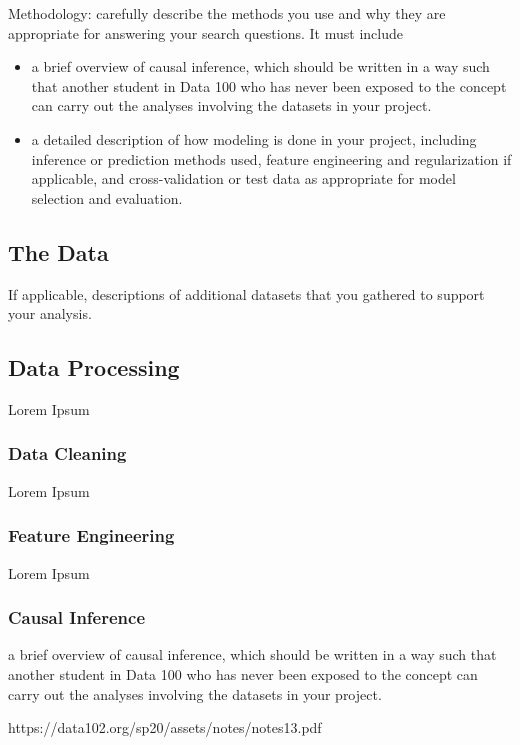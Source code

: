 \documentclass[11pt]{article}
\begin{document}
Methodology: carefully describe the methods you use and why they are appropriate for answering your search questions. It must include
\begin{itemize}
\item a brief overview of causal inference, which should be written in a way such that another student in Data 100 who has never been exposed to the concept can carry out the analyses involving the datasets in your project.
\item a detailed description of how modeling is done in your project, including inference or prediction methods used, feature engineering and regularization if applicable, and cross-validation or test data as appropriate for model selection and evaluation.
\end{itemize}


\subsection{The Data}

If applicable, descriptions of additional datasets that you gathered to support your analysis.

\subsection{Data Processing}
Lorem Ipsum \\

\subsubsection{Data Cleaning}
Lorem Ipsum \\

\subsubsection{Feature Engineering}
Lorem Ipsum \\


\subsubsection{Causal Inference}
a brief overview of causal inference, which should be written in a way such that another student in Data 100 who has never been exposed to the concept can carry out the analyses involving the datasets in your project.



https://data102.org/sp20/assets/notes/notes13.pdf
\end{document}
